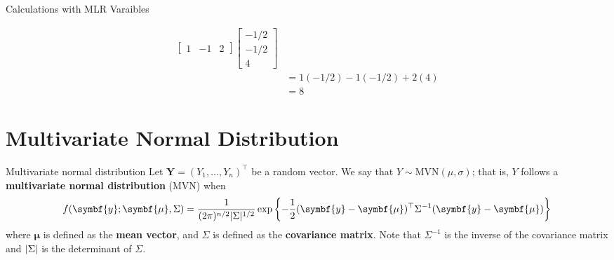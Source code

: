 \begin{Example}{Calculations with MLR Varaibles}{}
\begin{enumerate}[label=(\roman*)]
\begin{align*}
\begin{bmatrix}
                      1 & -1 & 2
                  \end{bmatrix}
                  \begin{bmatrix}
                      -1/2 \\
                      -1/2 \\
                      4
                  \end{bmatrix}                  \\
                   & =1(-1/2)-1(-1/2)+2(4)                    \\
                   & =8
              \end{align*}
    \end{enumerate}
\end{Example}
\section{Multivariate Normal Distribution}
\begin{Definition}{Multivariate normal distribution}{}
    Let $ \symbf{Y}=(Y_1,\ldots,Y_n)^\top $
    be a random vector. We say
    that $ Y \sim \text{MVN}(\mu,\sigma) $; that is,
    $ Y $ follows a \textbf{multivariate normal distribution} (MVN) when
    \[ f(\symbf{y};\symbf{\mu},\Sigma)=
        \frac{1}{(2\pi)^{n/2}\abs{\Sigma}^{1/2}}
        \exp\left\{ -\frac{1}{2}(\symbf{y}-\symbf{\mu})^\top
        \Sigma^{-1}(\symbf{y}-\symbf{\mu}) \right\}  \]
    where $ \symbf{\mu} $ is defined as the \textbf{mean vector},
    and $ \Sigma $ is defined as the \textbf{covariance matrix}.
    Note that $ \Sigma^{-1} $ is the inverse of the covariance matrix
    and $ \lvert\Sigma\rvert $ is the determinant of $ \Sigma $.
\end{Definition}

